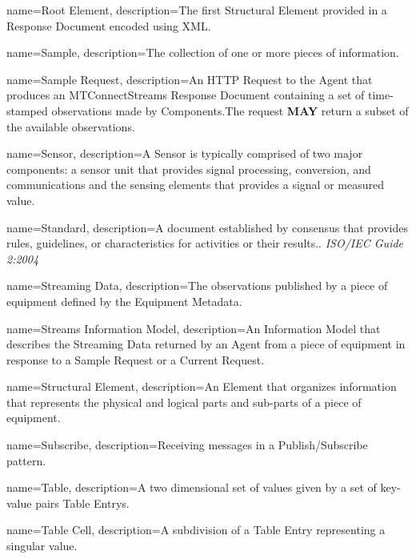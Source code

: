 {
    name={Root Element},
	description={The first \gls{Structural Element} provided in a \gls{Response Document} encoded using XML. }
}

{
    name={Sample},
	description={The collection of one or more pieces of information.  
}
}

{
    name={Sample Request},
	description={An \gls{HTTP Request} to the \gls{Agent} that produces an \gls{MTConnectStreams Response Document} containing a set of time-stamped \glspl{observation} made by \glspl{Component}.The request \textbf{MAY} return a subset of the available \glspl{observation}.}
}

{
    name={Sensor},
	description={A \gls{Sensor} is typically comprised of two major components: a \gls{sensor unit} that provides signal processing, conversion, and communications and the \glspl{sensing element} that provides a signal or measured value.}
}

{
    name={Standard},
	description={A document established by consensus that provides rules, guidelines, or characteristics for activities or their results.. \textit{ISO/IEC Guide 2:2004}}
}

{
    name={Streaming Data},
	description={The \glspl{observation} published by a piece of equipment defined by the \gls{Equipment Metadata}.}
}

{
    name={Streams Information Model},
	description={An \gls{Information Model} that describes the \gls{Streaming Data} returned by an \gls{Agent} from a piece of equipment in response to a \gls{Sample Request} or a \gls{Current Request}.}
}

{
    name={Structural Element},
	description={An \gls{Element} that organizes information that represents the physical and logical parts and sub-parts of a piece of equipment.}
}

{
    name={Subscribe},
	description={Receiving messages in a \gls{Publish/Subscribe} pattern.}
}

{
    name={Table},
	description={A two dimensional set of values given by a set of \glspl{key-value pair} \glspl{Table Entry}. }
}

{
    name={Table Cell},
	description={A subdivision of a \gls{Table Entry} representing a singular value.}
}


